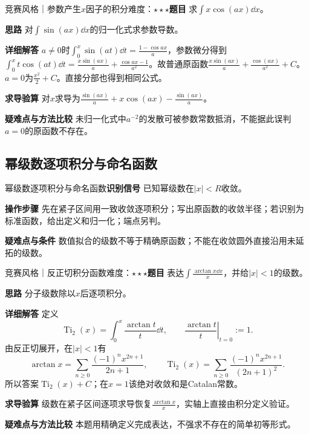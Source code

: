 \begin{example}{竞赛风格｜参数产生$x$因子的积分}{难度：$\star\star\star$}\label{ic:ex:indefinite_special_complete:paramtrig}\textbf{题目} 求$\int x\cos(ax)\dd x$。\par \textbf{思路} 对$\int\sin(ax)\dd x$的归一化式求参数导数。\par \textbf{详细解答} $a\ne0$时$\int_0^x\sin(at)\dd t=\frac{1-\cos ax}{a}$，参数微分得到$\int_0^xt\cos(at)\dd t=\frac{x\sin(ax)}{a}+\frac{\cos ax-1}{a^2}$。故普通原函数$\frac{x\sin(ax)}{a}+\frac{\cos(ax)}{a^2}+C$。$a=0$为$\frac{x^2}{2}+C$。直接分部也得到相同公式。\par \textbf{求导验算} 对$x$求导为$\frac{\sin(ax)}{a}+x\cos(ax)-\frac{\sin(ax)}{a}$。\par \textbf{疑难点与方法比较} 未归一化式中$a^{-2}$的发散可被参数常数抵消，不能据此误判$a=0$的原函数不存在。\end{example}

\subsection{幂级数逐项积分与命名函数}\label{ic:indefinite_special_complete:series}\begin{method}{幂级数逐项积分与命名函数}\textbf{识别信号} 已知幂级数在$|x|<R$收敛。\par \textbf{操作步骤} 先在紧子区间用一致收敛逐项积分；写出原函数的收敛半径；若识别为标准函数，给出定义和归一化；端点另判。\par \textbf{疑难点与条件} 数值拟合的级数不等于精确原函数；不能在收敛圆外直接沿用未延拓的级数。\end{method}

\begin{example}{竞赛风格｜反正切积分函数}{难度：$\star\star\star$}\label{ic:ex:indefinite_special_complete:invlogseries}\textbf{题目} 表达$\int\frac{\arctan x\dd x}{x}$，并给$|x|<1$的级数。\par \textbf{思路} 分子级数除以$x$后逐项积分。\par \textbf{详细解答} 定义\[\operatorname{Ti}_2(x)=\int_0^x\dfrac{\arctan t}{t}\dd t,\qquad \left.\dfrac{\arctan t}{t}\right|_{t=0}:=1.\]由反正切展开，在$|x|<1$有\[\arctan x=\sum_{n\ge0}\dfrac{(-1)^nx^{2n+1}}{2n+1},\qquad \operatorname{Ti}_2(x)=\sum_{n\ge0}\dfrac{(-1)^nx^{2n+1}}{(2n+1)^2}.\]所以答案$\operatorname{Ti}_2(x)+C$；在$x=1$该绝对收敛和是Catalan常数。\par \textbf{求导验算} 级数在紧子区间逐项求导恢复$\frac{\arctan x}{x}$，实轴上直接由积分定义验证。\par \textbf{疑难点与方法比较} 本题用精确定义完成表达，不强求不存在的简单初等形式。\end{example}

